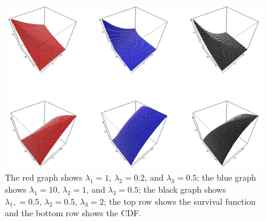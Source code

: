 \begin{figure}[ht]
    \centering
    \includegraphics[scale=0.45]{images/3DMO.PNG}
    \caption{The red graph shows $\lambda_1=1$, $\lambda_2=0.2$, and $\lambda_3=0.5$; the blue graph shows $\lambda_1=10$, $\lambda_2=1$, and $\lambda_3=0.5$; the black graph shows $\lambda_1,=0.5$, $\lambda_2=0.5$, $\lambda_3=2$; the top row shows the survival function and the bottom row shows the CDF.}
    \label{fig:MO3d}
\end{figure}

